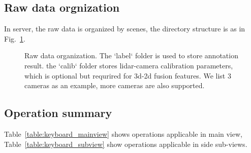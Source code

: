 \documentclass[letterpaper, 10 pt, conference]{ieeeconf}  %
\begin{document}
\subsection{Raw data orgnization}
In server, the raw data is organized by scenes, the directory structure is as in Fig.~\ref{fig:data-dir}.

\begin{figure}

	\caption{Raw data organization. The `label` folder is used to store annotation result. the `calib` folder stores lidar-camera calibration parameters, which is optional but requrired for 3d-2d fusion features. We list 3 cameras as an example, more cameras are also supported.}
	\label{fig:data-dir}
\end{figure}


\subsection{Operation summary}
\label{app:operations}
Table~\ref{table:keyboard_mainview} shows operations applicable in main view, Table~\ref{table:keyboard_subview} show operations applicable in side sub-views.
\end{document}
